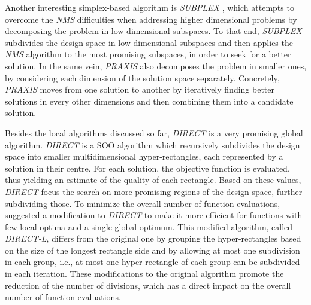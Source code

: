 	Another interesting simplex-based algorithm is \textit{SUBPLEX} \cite{Rowan1990}, which attempts to overcome the \textit{\ac{NMS}} difficulties when addressing higher dimensional problems by decomposing the problem in low\nobreakdash-\hspace{0pt}dimensional
	subspaces. To that end, \textit{SUBPLEX} subdivides the design space in low-dimensional subspaces and then applies the \textit{\ac{NMS}} algorithm to the most promising subspaces, in order to seek for a better solution. %
	In the same vein, \textit{\ac{PRAXIS}} \cite{Brent1973} also decomposes the problem in smaller ones, by considering each dimension of the solution space separately. Concretely, \textit{\ac{PRAXIS}} moves from one solution to another by iteratively finding better solutions in every other dimensions and then combining them into a candidate solution. 
	
	Besides the local algorithms discussed so far, \textit{\ac{DIRECT}} is a very promising global algorithm. \textit{\ac{DIRECT}} \cite{Jones1993DIRECT} is a \ac{SOO} algorithm which recursively subdivides the design space into smaller multidimensional hyper-rectangles, each represented by a solution in their centre. For each solution, the objective function is evaluated, thus yielding an estimate of the quality of each rectangle. Based on these values, \textit{\ac{DIRECT}} focus the search on more promising regions of the design space, further subdividing those. To minimize the overall number of function evaluations, \cite{Gablonsky2001} suggested a modification to \textit{\ac{DIRECT}} to make it more efficient for functions with few local optima and a single global optimum. This modified algorithm, called \textit{\ac{DIRECT}-L}, differs from the original one by grouping the hyper-rectangles based on the size of the longest rectangle side and by allowing at most one subdivision in each group, i.e., at most one hyper-rectangle of each group can be subdivided in each iteration. These modifications to the original algorithm promote the reduction of the number of divisions, which has a direct impact on the overall number of function evaluations.
	
